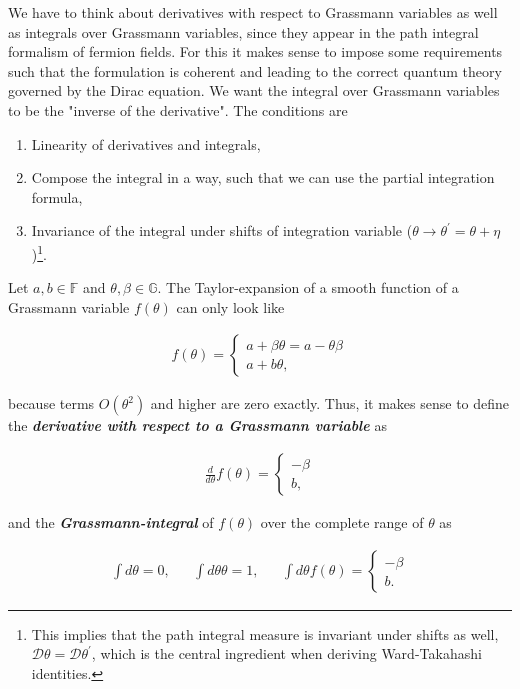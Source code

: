 \documentclass{article}
\theoremstyle{plain} %
\theoremstyle{convention} %
\theoremstyle{remark} %
\def\df#1{\textbf{\textit{#1}}}
\numberwithin{equation}{section}
\begin{document}
\begin{appendix}
We have to think about derivatives with respect to Grassmann variables as well as integrals over Grassmann variables, since they appear in the path integral formalism of fermion fields. For this it makes sense to impose some requirements such that the formulation is coherent and leading to the correct quantum theory governed by the Dirac equation. We want the integral over Grassmann variables to be the "inverse of the derivative". The conditions are

\begin{enumerate}
  \item Linearity of derivatives and integrals,
  \item Compose the integral in a way, such that we can use the partial integration formula,
  \item Invariance of the integral under shifts of integration variable ($\theta \rightarrow \theta^{\prime} = \theta + \eta$)\footnote{This implies that the path integral measure is invariant under shifts as well, $\mathcal{D} \theta = \mathcal{D} \theta^{\prime}$, which is the central ingredient when deriving Ward-Takahashi identities.}.
\end{enumerate}

Let $a,b \in \mathbb{F}$ and $\theta, \beta \in \mathbb{G}$. The Taylor-expansion of a smooth function of a Grassmann variable $f(\theta)$ can only look like

\begin{align*}
  f(\theta) = \left\{
      \begin{array}{ll}
          a + \beta \theta = a - \theta \beta \\
          a + b \theta,
      \end{array}
  \right.
\end{align*}

because terms $O(\theta^2)$ and higher are zero exactly. Thus, it makes sense to define the \df{derivative with respect to a Grassmann variable} as

\begin{align*}
  \frac{d}{d \theta} f(\theta) = \left\{
      \begin{array}{ll}
          -\beta \\
          b,
      \end{array}
  \right.
\end{align*}

and the \df{Grassmann-integral} of $f(\theta)$ over the complete range of $\theta$ as

\begin{align*}
  \int d \theta = 0, &&\int d \theta \theta = 1, &&\int d \theta f(\theta) = \left\{
      \begin{array}{ll}
          -\beta \\
          b.
      \end{array}
  \right.
\end{align*}


\end{appendix}
\end{document}
